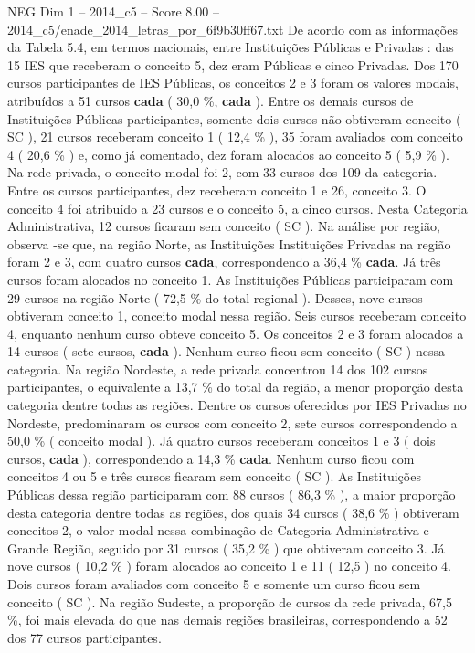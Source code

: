 \begin{textsample}{NEG Dim 1 – 2014\_c5 – Score 8.00 – 2014\_c5/enade\_2014\_letras\_por\_6f9b30ff67.txt}
De acordo com as informações da Tabela 5.4, em termos nacionais, entre Instituições Públicas e Privadas : das 15 IES que receberam o conceito 5, dez eram Públicas e cinco Privadas.
Dos 170 cursos participantes de IES Públicas, os conceitos 2 e 3 foram os valores modais, atribuídos a 51 cursos \textbf{cada} ( 30,0 \%, \textbf{cada} ).
Entre os demais cursos de Instituições Públicas participantes, somente dois cursos não obtiveram conceito ( SC ), 21 cursos receberam conceito 1 ( 12,4 \% ), 35 foram avaliados com conceito 4 ( 20,6 \% ) e, como já comentado, dez foram alocados ao conceito 5 ( 5,9 \% ).
Na rede privada, o conceito modal foi 2, com 33 cursos dos 109 da categoria.
Entre os cursos participantes, dez receberam conceito 1 e 26, conceito 3.
O conceito 4 foi atribuído a 23 cursos e o conceito 5, a cinco cursos.
Nesta Categoria Administrativa, 12 cursos ficaram sem conceito ( SC ).
Na análise por região, observa -se que, na região Norte, as Instituições Instituições Privadas na região foram 2 e 3, com quatro cursos \textbf{cada}, correspondendo a 36,4 \% \textbf{cada}.
Já três cursos foram alocados no conceito 1.
As Instituições Públicas participaram com 29 cursos na região Norte ( 72,5 \% do total regional ).
Desses, nove cursos obtiveram conceito 1, conceito modal nessa região.
Seis cursos receberam conceito 4, enquanto nenhum curso obteve conceito 5.
Os conceitos 2 e 3 foram alocados a 14 cursos ( sete cursos, \textbf{cada} ).
Nenhum curso ficou sem conceito ( SC ) nessa categoria.
Na região Nordeste, a rede privada concentrou 14 dos 102 cursos participantes, o equivalente a 13,7 \% do total da região, a menor proporção desta categoria dentre todas as regiões.
Dentre os cursos oferecidos por IES Privadas no Nordeste, predominaram os cursos com conceito 2, sete cursos correspondendo a 50,0 \% ( conceito modal ).
Já quatro cursos receberam conceitos 1 e 3 ( dois cursos, \textbf{cada} ), correspondendo a 14,3 \% \textbf{cada}.
Nenhum curso ficou com conceitos 4 ou 5 e três cursos ficaram sem conceito ( SC ).
As Instituições Públicas dessa região participaram com 88 cursos ( 86,3 \% ), a maior proporção desta categoria dentre todas as regiões, dos quais 34 cursos ( 38,6 \% ) obtiveram conceitos 2, o valor modal nessa combinação de Categoria Administrativa e Grande Região, seguido por 31 cursos ( 35,2 \% ) que obtiveram conceito 3.
Já nove cursos ( 10,2 \% ) foram alocados ao conceito 1 e 11 ( 12,5 ) no conceito 4.
Dois cursos foram avaliados com conceito 5 e somente um curso ficou sem conceito ( SC ).
Na região Sudeste, a proporção de cursos da rede privada, 67,5 \%, foi mais elevada do que nas demais regiões brasileiras, correspondendo a 52 dos 77 cursos participantes.

\end{textsample}
